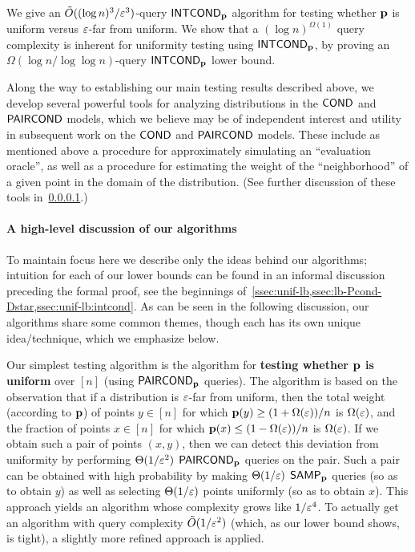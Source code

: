 We give an $\tilde{O}((\log n)^3/\varepsilon^3)$-query ${\sf INTCOND}_{\mathbf{p}}$ algorithm
for testing whether $\mathbf{p}$ is uniform versus $\varepsilon$-far from uniform.
We show that a $(\log n)^{\Omega(1)}$ query complexity is inherent for
uniformity testing using ${\sf INTCOND}_{\mathbf{p}}$, by proving
an $\Omega\left(\log n/\log \log n\right)$-query
${\sf INTCOND}_{\mathbf{p}}$ lower bound.

Along the way to establishing our main testing results described above, we develop several
powerful tools for analyzing distributions in the ${\sf COND}$ and ${\sf PAIRCOND}$
models, which we believe may be of independent interest and utility
in subsequent work on the ${\sf COND}$ and ${\sf PAIRCOND}$ models.
  These include as mentioned above a procedure for approximately simulating an ``evaluation
oracle'', as well as a procedure for estimating the weight of the ``neighborhood''
of a given point in the domain of the distribution. (See further discussion of
these tools in~\cref{subsubsec:algs-desc}.)



\paragraph{A high-level discussion of our algorithms}\label{subsubsec:algs-desc}
To maintain focus here we describe only the ideas behind our
algorithms; intuition for each of our lower bounds can be found
in an informal discussion preceding the formal
proof, see the beginnings of~\cref{ssec:unif-lb,ssec:lb-Pcond-Dstar,ssec:unif-lb:intcond}.
As can be seen in the following discussion, our algorithms
share some common themes, though each has its own unique idea/technique,
which we emphasize below.

Our simplest testing algorithm is the algorithm for {\bf testing whether
$\mathbf{p}$ is uniform} over $[n]$ (using ${\sf PAIRCOND}_{\mathbf{p}}$ queries). The algorithm is based on
the observation that if a distribution is $\varepsilon$-far from uniform, then
the total weight (according to $\mathbf{p}$) of points $y\in [n]$ for which
$\mathbf{p}(y)\geq (1+\Omega(\varepsilon))/n$
is $\Omega(\varepsilon)$, and the
fraction of points $x\in [n]$ for which $\mathbf{p}(x) \leq (1-\Omega(\varepsilon))/n$
is $\Omega(\varepsilon)$. If we obtain such a pair of points $(x,y)$,
then we can detect this deviation from uniformity by performing
$\Theta(1/\varepsilon^2)$  ${\sf PAIRCOND}_{\mathbf{p}}$ queries
on the pair. Such a pair can be obtained with high probability by making
$\Theta(1/\varepsilon)$ ${\sf SAMP}_{\mathbf{p}}$ queries (so as to obtain $y$)
as well as selecting $\Theta(1/\varepsilon)$ points uniformly (so as to obtain $x$).
This approach yields an algorithm whose complexity grows like $1/\varepsilon^4$.
To actually get an algorithm with query complexity $\tilde{O}(1/\varepsilon^2)$
(which, as our lower bound shows, is tight),
a slightly more refined approach is applied.

